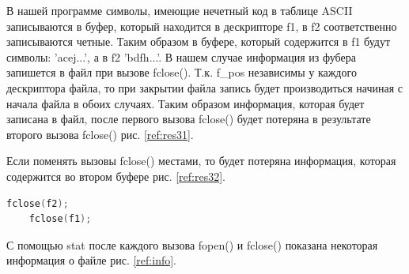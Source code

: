 \documentclass[a4paper,oneside,12pt]{extreport}
\begin{document}
\begin{task}
    В нашей программе символы, имеющие нечетный код в таблице ASCII
    записываются в буфер, который находится в дескрипторе f1, 
    в f2 соответственно записываются четные. 
    Таким образом в буфере, который содержится в f1 будут символы: 'acej...', 
    а в f2 'bdfh...'.
    В нашем случае информация из фубера запишется в файл при вызове fclose().
    Т.к. f\_pos независимы у каждого дескриптора файла, то при закрытии файла
    запись будет производиться начиная с начала файла в обоих случаях.
    Таким образом информация, которая будет записана в файл, после первого вызова
    fclose() будет потеряна в результате второго вызова fclose() рис. \ref{ref:res31}.   
   
    \begin{figure}[ht!]
    \end{figure}

    Если поменять вызовы fclose() местами, то будет потеряна информация,
    которая содержится во втором буфере рис. \ref{ref:res32}.
    \begin{lstlisting}[language=C]
    fclose(f2);
    fclose(f1);
    \end{lstlisting}

    \begin{figure}[ht!]
    \end{figure}

    \newpage
    С помощью stat после каждого вызова fopen() и fclose()
    показана некоторая информация о файле рис. \ref{ref:info}. 


\end{task}
\end{document}

